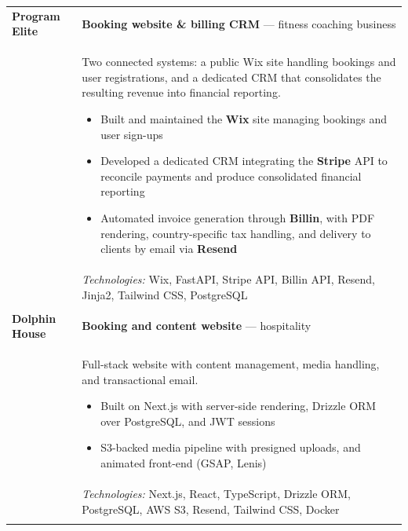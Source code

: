 \begin{longtable}{C{2.5cm}|p{14.8cm}}
	\textbf{Program Elite} & \textbf{Booking website \& billing CRM} --- fitness coaching business\\&
	\footnotesize{
		Two connected systems: a public Wix site handling bookings and user registrations, and a
		dedicated CRM that consolidates the resulting revenue into financial reporting.
		\begin{itemize}
			\item Built and maintained the \textbf{Wix} site managing bookings and user sign-ups
			\item Developed a dedicated CRM integrating the \textbf{Stripe} API to reconcile payments and produce consolidated financial reporting
			\item Automated invoice generation through \textbf{Billin}, with PDF rendering, country-specific tax handling, and delivery to clients by email via \textbf{Resend}
		\end{itemize}
		\vspace{-1em}
	}\\&
	\footnotesize{\emph{Technologies:} Wix, FastAPI, Stripe API, Billin API, Resend, Jinja2, Tailwind CSS, PostgreSQL}\\
\\

	\textbf{Dolphin House} & \textbf{Booking and content website} --- hospitality \hfill \footnotesize{}\\&
	\footnotesize{
		Full-stack website with content management, media handling, and transactional email.
		\begin{itemize}
			\item Built on Next.js with server-side rendering, Drizzle ORM over PostgreSQL, and JWT sessions
			\item S3-backed media pipeline with presigned uploads, and animated front-end (GSAP, Lenis)
		\end{itemize}
		\vspace{-1em}
	}\\&
	\footnotesize{\emph{Technologies:} Next.js, React, TypeScript, Drizzle ORM, PostgreSQL, AWS S3, Resend, Tailwind CSS, Docker}\\

\\


\end{longtable}
